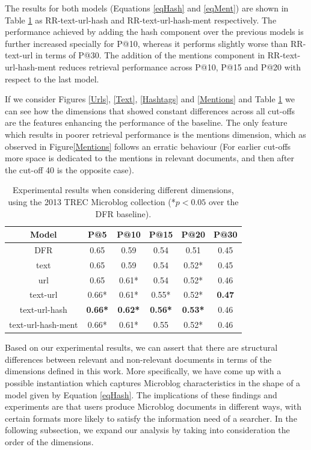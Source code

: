 The results for both models (Equations \ref{eqHash} and \ref{eqMent}) are shown in Table \ref{dimResults} as RR-text-url-hash and RR-text-url-hash-ment respectively. The performance achieved by adding the hash component over the previous models is further increased specially for P@10, whereas it performs slightly worse than RR-text-url in terms of P@30. The addition of the mentions component in RR-text-url-hash-ment reduces retrieval performance across P@10, P@15 and P@20 with respect to the last model.

If we consider Figures \ref{Urls}, \ref{Text}, \ref{Hashtags} and \ref{Mentions} and Table \ref{dimResults} we can see how the dimensions that showed constant differences across all cut-offs are the features enhancing the performance of the baseline. The only feature which results in poorer retrieval performance is the mentions dimension, which as observed in Figure\ref{Mentions} follows an erratic behaviour (For earlier cut-offs more space is dedicated to the mentions in relevant documents, and then after the cut-off 40 is the opposite case).

\begin{table}[]
\caption{Experimental results when considering different dimensions, using the 2013 TREC Microblog collection (*\(p <0.05 \) over the DFR baseline).}
\centering
\begin{tabular}{|c|c|c|c|c|c|}
\hline Model & P@5 & P@10  & P@15  & P@20  & P@30  \\
\hline
DFR & 0.65 & 0.59 & 0.54 & 0.51 & 0.45 \\
\hline
text & 0.65 & 0.59 & 0.54 & 0.52* & 0.45 \\
url & 0.65 & 0.61* & 0.54 & 0.52* & 0.46 \\
text-url & 0.66* & 0.61* & 0.55* & 0.52* & \textbf{0.47} \\
text-url-hash & \textbf{0.66*} & \textbf{0.62*} & \textbf{0.56*} & \textbf{0.53*} & 0.46 \\
text-url-hash-ment & 0.66* & 0.61* & 0.55 & 0.52* & 0.46 \\
\hline 
\end{tabular} 
\label{dimResults}
\vspace{0.30cm}
\end{table}

Based on our experimental results, we can assert that there are structural differences between relevant and non-relevant documents in terms of the dimensions defined in this work. More specifically, we have come up with a possible instantiation which captures Microblog characteristics in the shape of a model given by Equation \ref{eqHash}. The implications of these findings and experiments are that users produce Microblog documents in different ways, with certain formats more likely to satisfy the information need of a searcher. In the following subsection, we expand our analysis by taking into consideration the order of the dimensions.